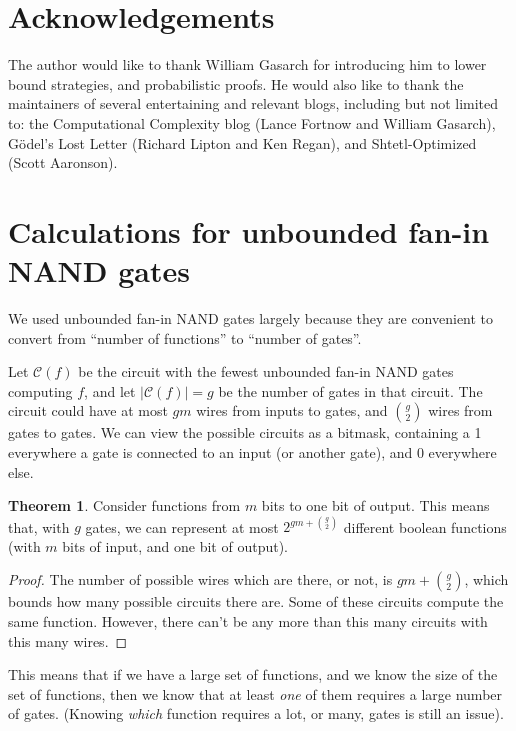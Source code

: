 \documentclass[12pt]{article}
\theoremstyle{definition}
\newtheorem{thm}{Theorem}[section]
\newcommand{\bigC}[0]{\mathcal{C}}
\begin{document}
\section{Acknowledgements}

The author would like to thank William Gasarch for introducing him
to lower bound strategies, and probabilistic proofs.
He would also like to thank the maintainers of
several entertaining and relevant blogs, including but
not limited to: the Computational Complexity blog
(Lance Fortnow and William Gasarch), 
G\"odel's Lost Letter (Richard Lipton and Ken Regan),
and Shtetl-Optimized (Scott Aaronson). 


\appendix
\section{Calculations for unbounded fan-in NAND gates}
\label{gateMath}

We used unbounded fan-in NAND gates largely because they are
convenient to convert from ``number of functions'' to
``number of gates''.

Let $\bigC(f)$ be the circuit
with the fewest unbounded fan-in NAND
gates computing $f$, and let $|\bigC(f)| = g$ be the number of gates in
that circuit. The
circuit could have at most $gm$ wires from inputs to gates, and ${g \choose 2}$
wires from gates to gates. We can view the possible circuits as a bitmask,
containing a 1 everywhere a gate is connected to an input (or another gate),
and 0 everywhere else.

\begin{thm}
\label{boundFromCounting}
Consider functions from $m$ bits to one bit of output.
This means that, with $g$ gates, we can represent at most
$2^{gm + {g \choose 2}}$ different boolean functions (with $m$ bits of input,
and one bit of output).
\end{thm}
\begin{proof}

The number of possible wires which are there, or not, is $gm + {g \choose 2}$,
which bounds how many possible circuits there are.
Some of these circuits compute the same function.
However, there can't be any more than this many circuits with this many wires.
\end{proof}

This means that if we have a large set of functions, and we know the size of
the set of functions, then we know that at least {\em one} of them requires
a large number of gates. (Knowing {\em which} function requires a lot, or many,
gates is still an issue).
\end{document}

